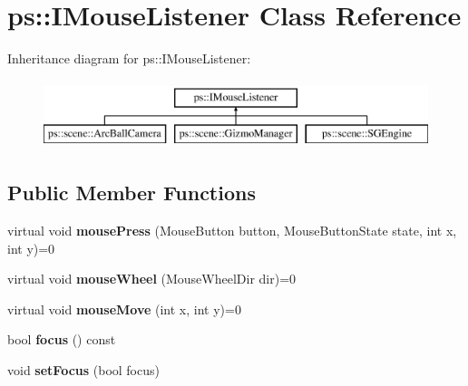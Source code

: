 \hypertarget{classps_1_1IMouseListener}{}\section{ps\+:\+:I\+Mouse\+Listener Class Reference}
\label{classps_1_1IMouseListener}
Inheritance diagram for ps\+:\+:I\+Mouse\+Listener\+:\begin{figure}[H]
\begin{center}
\leavevmode
\includegraphics[height=2.000000cm]{classps_1_1IMouseListener}
\end{center}
\end{figure}
\subsection*{Public Member Functions}
\begin{DoxyCompactItemize}
\item 
\hypertarget{classps_1_1IMouseListener_ac30b7cd36737a4872b14a6dcbfaa88a7}{}virtual void {\bfseries mouse\+Press} (Mouse\+Button button, Mouse\+Button\+State state, int x, int y)=0\label{classps_1_1IMouseListener_ac30b7cd36737a4872b14a6dcbfaa88a7}

\item 
\hypertarget{classps_1_1IMouseListener_a1367f4f01d79dbc53d2093ac77008ca2}{}virtual void {\bfseries mouse\+Wheel} (Mouse\+Wheel\+Dir dir)=0\label{classps_1_1IMouseListener_a1367f4f01d79dbc53d2093ac77008ca2}

\item 
\hypertarget{classps_1_1IMouseListener_a7e36ab6e79d160fe32149a5334e74635}{}virtual void {\bfseries mouse\+Move} (int x, int y)=0\label{classps_1_1IMouseListener_a7e36ab6e79d160fe32149a5334e74635}

\item 
\hypertarget{classps_1_1IMouseListener_a70483b82ea66860b5d51303c63af9dda}{}bool {\bfseries focus} () const \label{classps_1_1IMouseListener_a70483b82ea66860b5d51303c63af9dda}

\item 
\hypertarget{classps_1_1IMouseListener_a430f1e62d5072a0177715135d6640d99}{}void {\bfseries set\+Focus} (bool focus)\label{classps_1_1IMouseListener_a430f1e62d5072a0177715135d6640d99}

\end{DoxyCompactItemize}
